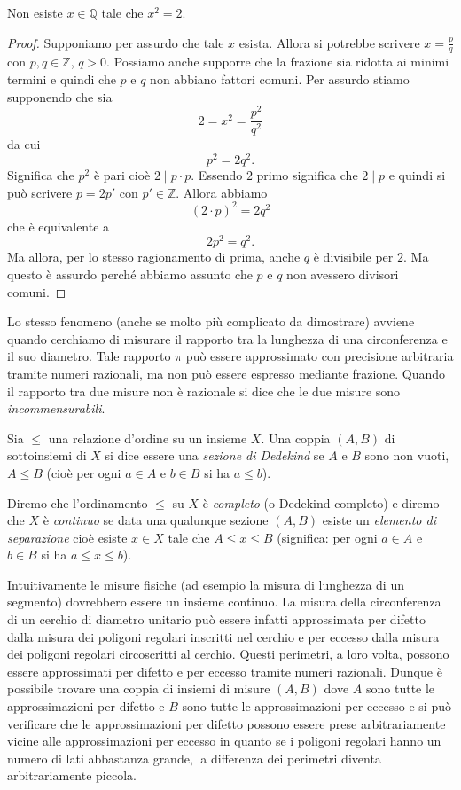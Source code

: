 \documentclass[italian,a4paper,hidelinks,headinclude]{scrartcl}
\newcommand{\ZZ}{{\mathbb Z}}
\newcommand{\QQ}{{\mathbb Q}}
\newcommand{\myemph}[1]{\emph{#1}\marginpar{#1}}
\begin{document}
\begin{theorem}[Pitagora]
  Non esiste $x\in \QQ$ tale che $x^2=2$.
\end{theorem}
%
\begin{proof}
  Supponiamo per assurdo che tale $x$ esista. Allora si potrebbe
  scrivere $x=\frac{p}{q}$ con $p,q\in \ZZ$, $q>0$.
  Possiamo anche supporre che la frazione sia ridotta ai minimi termini
  e quindi che $p$ e $q$ non abbiano fattori comuni.
  Per assurdo stiamo supponendo che sia
  \[
    2 = x^2= \frac{p^2}{q^2}
  \]
  da cui
  \[
   p^2 = 2 q^2.
  \]
  Significa che $p^2$ è pari cioè $2\mid p\cdot p$.
  Essendo $2$ primo significa che $2 \mid p$ e quindi si può
  scrivere $p=2p'$ con $p'\in \ZZ$. Allora abbiamo
  \[
    (2\cdot p)^2 = 2 q^2
  \]
  che è equivalente a
  \[
    2 p^2 = q^2.
  \]
  Ma allora, per lo stesso ragionamento di prima, anche $q$ è divisibile per
  $2$. Ma questo è assurdo perché abbiamo assunto che $p$ e $q$ non avessero
  divisori comuni.
\end{proof}

Lo stesso fenomeno (anche se molto più complicato da dimostrare) avviene quando cerchiamo di misurare il rapporto tra la lunghezza di una circonferenza e il suo diametro. Tale rapporto $\pi$ può essere approssimato con precisione arbitraria tramite numeri razionali, ma non può essere espresso mediante frazione.
Quando il rapporto tra due misure non è razionale si dice che le due misure sono \emph{incommensurabili}.

\begin{definition}
Sia $\le$ una relazione d'ordine su un insieme $X$.
Una coppia $(A,B)$ di sottoinsiemi di $X$ si dice essere
una \myemph{sezione di Dedekind} se $A$ e $B$ sono non vuoti,
$A\le B$ (cioè per ogni $a\in A$ e $b\in B$ si ha $a\le b$).

Diremo che l'ordinamento $\le$ su $X$ è \myemph{completo} (o Dedekind completo)
e diremo che $X$ è \emph{continuo}
se data una qualunque sezione $(A,B)$ esiste un \myemph{elemento di separazione}
cioè esiste $x\in X$ tale che $A \le x \le B$ (significa: per ogni $a\in A$ e $b\in B$ si ha $a\le x \le b$).
\end{definition}

Intuitivamente le misure fisiche (ad esempio la misura di lunghezza di un segmento)
dovrebbero essere un insieme continuo. La misura della circonferenza di
un cerchio di diametro unitario può essere infatti approssimata per difetto
dalla misura dei poligoni regolari inscritti nel cerchio e per eccesso dalla
misura dei poligoni regolari circoscritti al cerchio. Questi perimetri,
a loro volta, possono essere approssimati per difetto e per eccesso tramite
numeri razionali. Dunque è possibile trovare una coppia di insiemi di misure
$(A,B)$ dove $A$ sono tutte le approssimazioni per difetto e $B$ sono tutte le
approssimazioni per eccesso e si può verificare che le approssimazioni
per difetto possono essere prese arbitrariamente vicine alle approssimazioni per
eccesso in quanto se i poligoni regolari hanno un numero di lati
abbastanza grande, la differenza dei perimetri diventa arbitrariamente piccola.
\end{document}
